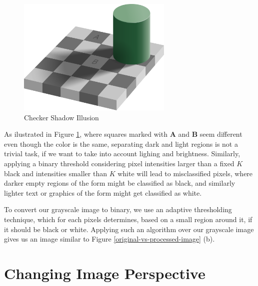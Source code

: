 \documentclass[12pt, a4paper]{report}
\begin{document}
 \begin{figure}[!h]
  \centering
  \includegraphics[width=20em]{images/other/Checker_shadow_illusion.svg.png}
  \caption{Checker Shadow Illusion\cite{checker-illusion}}
  \label{checker-illusion}
\end{figure}

As ilustrated in Figure \ref{checker-illusion}, where squares marked with \textbf{A} and \textbf{B} seem different even though the color is the same, separating dark and light regions is not a trivial task, if we want to take into account lighing and brightness. Similarly, applying a binary threshold considering pixel intensities larger than a fixed $K$ black and intensities smaller than $K$ white will lead to misclassified pixels, where darker empty regions of the form might be classified as black, and similarly lighter text or graphics of the form might get classified as white.

To convert our grayscale image to binary, we use an adaptive thresholding technique\cite{opencv-image-threshold}, which for each pixels determines, based on a small region around it, if it should be black or white. Applying such an algorithm over our grayscale image gives us an image similar to Figure \ref{original-vs-processed-image} (b).



\section{Changing Image Perspective}

\end{document}
